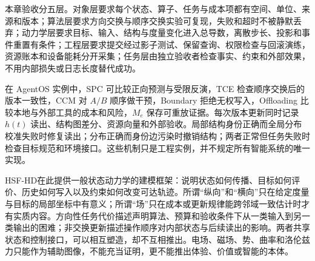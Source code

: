 本章验收分五层。对象层要求每个状态、算子、任务与成本项都有空间、单位、来源和版本；算法层要求方向交换与顺序交换实验可复现，失败和超时不被静默丢弃；动力学层要求目标、输入、结构与度量变化进入总导数，离散步长、投影和事件重置有条件；工程层要求提交经过影子测试、保留查询、权限检查与回滚演练，资源账本和设备能耗分开采集；任务层由独立验收者检查事实、约束和外部效果，不用内部损失或日志长度替代成功。

在 AgentOS 实例中，SPC 可比较正向预测与受限反演，TCE 检查顺序交换后的版本一致性，CCM 对 $A/B$ 顺序做干预，Boundary 拒绝无权写入，Offloading 比较本地与外部工具的成本和风险，$M_e$ 保存可重放证据。每次版本更新同时记录 $h(t)$ 读出、结构图差分、资源向量和外部验收。局部结构身份正确而全局分布校准失败时修复读出；分布正确而身份边污染时撤销结构；两者正常但任务失败时检查目标规范和环境接口。这些机制只是工程实例，并不规定所有智能系统的唯一实现。

HSF-HD在此提供一般状态动力学的建模框架：说明状态如何传播、目标如何评价、历史如何写入以及约束如何改变可达轨迹。所谓“纵向”和“横向”只在给定度量与目标的局部坐标中有意义；所谓“场”只在成本或更新规律能跨邻域一致估计时才有实质内容。方向性任务代价描述声明算法、预算和验收条件下从一类输入到另一类输出的困难；非交换更新描述操作顺序对内部状态与后续读出的影响。两者共享状态和控制接口，可以相互塑造，却不互相推出。电场、磁场、势、曲率和洛伦兹力只能作为辅助图像，不能充当证明，更不能推出体验、价值或智能的本体。

